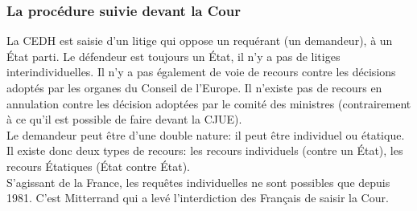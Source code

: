 \documentclass[10pt, a4paper, openany]{book}
\begin{document}
\subsubsection{La procédure suivie devant la Cour}

La CEDH est saisie d'un litige qui oppose un requérant (un demandeur), à un État parti. Le défendeur est toujours un État, il n'y a pas de litiges interindividuelles. Il n'y a pas également de voie de recours contre les décisions adoptés par les organes du Conseil de l'Europe. Il n'existe pas de recours en annulation contre les décision adoptées par le comité des ministres (contrairement à ce qu'il est possible de faire devant la CJUE). \\
Le demandeur peut être d'une double nature: il peut être individuel ou étatique. Il existe donc deux types de recours: les recours individuels (contre un État), les recours Étatiques (État contre État). \\
S'agissant de la France, les requêtes individuelles ne sont possibles que depuis 1981. C'est Mitterrand qui a levé l'interdiction des Français de saisir la Cour. 
\end{document}
